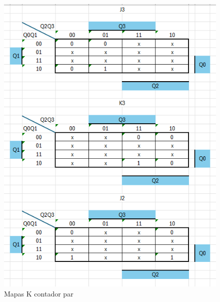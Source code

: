 \documentclass{article}
\begin{document}
\begin{figure}[h]
    \centering
    \begin{minipage}{0.45\textwidth} %
      \centering
      \includegraphics[width=\linewidth]{imagenes/mapask_contador_par_1.png} %
      \caption{Mapas K contador par}
      \label{fig:mapaskcontadorpar}
    \end{minipage}
    \hfill
    \begin{minipage}{0.45\textwidth} %
      \centering

\end{minipage}
\end{figure}
\end{document}
